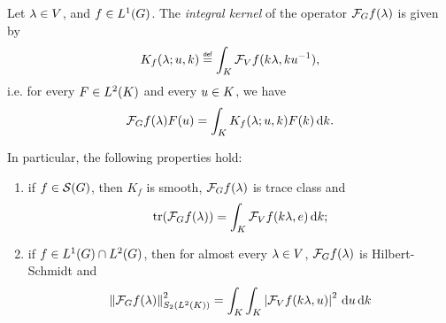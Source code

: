 \begin{lemma}
\label{lemma:kernels_of_Fourier_coefficients}
    Let $\lambda \in \VectorSpace$, and $f \in \Lebesgue{1}\Group$.
    The \emph{integral kernel} of the operator $\Fourier f(\lambda)$ is given by
    \begin{align}
        K_{f}(\lambda; u, k) \defeq \int_\CompactGroup \Fourier[\VectorSpace] f(k \lambda, k u^{-1}),
        \label{integral_kernel_of_Fourier_coefficient}
    \end{align}
    i.e. for every $F \in \Lebesgue{2}\CompactGroup$ and every $u \in \CompactGroup$, we have
    \begin{align*}
        \Fourier f(\lambda) F(u) = \int_\CompactGroup K_f(\lambda; u, k) F(k) \dd k.
    \end{align*}

    In particular, the following properties hold:
    \begin{enumerate}
        \item if $f \in \Schwartz\Group$, then $K_f$ is smooth,
            $\Fourier f(\lambda)$ is trace class and
            \begin{align*}
                \tr(\Fourier f(\lambda)) = \int_\CompactGroup \Fourier[\VectorSpace] f(k \lambda, e) \dd k;
            \end{align*}
        \item if $f \in \Lebesgue{1}\Group \cap \Lebesgue{2}\Group$, then for almost every $\lambda \in \VectorSpace$,
            $\Fourier f(\lambda)$ is Hilbert-Schmidt and
            \begin{align*}
                \norm[\SchattenClasses{2}{\Lebesgue{2}\CompactGroup}]{\Fourier f(\lambda)}^2
                = \int_\CompactGroup \int_\CompactGroup \abs{\Fourier[\VectorSpace] f(k \lambda, u)}^2 \dd u \dd k
            \end{align*}
    \end{enumerate}
\end{lemma}
